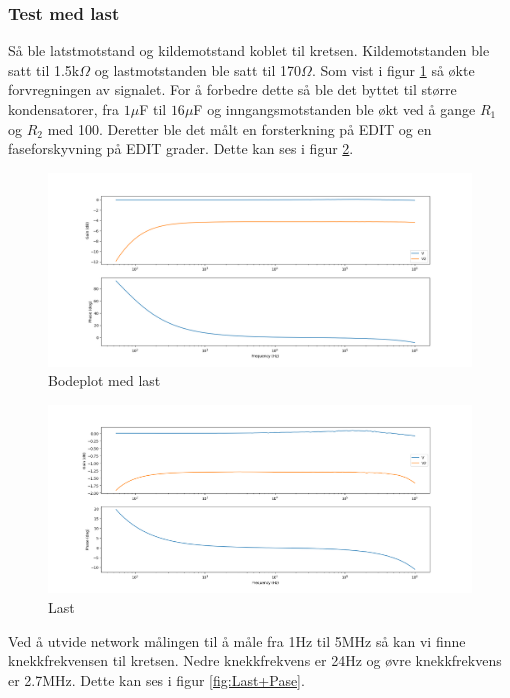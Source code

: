 \subsubsection{Test med last}

Så ble latstmotstand og kildemotstand koblet til kretsen. Kildemotstanden ble satt til 1.5k$\Omega$ og lastmotstanden ble satt til 170$\Omega$. Som vist i figur \ref{fig:Bodeplot+Pase_Second} så økte forvregningen av signalet. For å forbedre dette så ble det byttet til større kondensatorer, fra $1\mu$F til $16\mu$F og inngangsmotstanden ble økt ved å gange $R_1$ og $R_2$ med 100. Deretter ble det målt en forsterkning på EDIT og en faseforskyvning på EDIT grader. Dette kan ses i figur \ref{fig:Third}.

\begin{figure}[H]
\centering
\includegraphics[scale=0.4]{bilder/Bodeplot+Pase_Second.png}
\caption{Bodeplot med last}
\label{fig:Bodeplot+Pase_Second}
\end{figure}

\begin{figure}[H]
\centering
\includegraphics[scale=0.4]{bilder/Bodeplot+Pase_Third.png}
\caption{Last}
\label{fig:Third}
\end{figure}

Ved å utvide network målingen til å måle fra 1Hz til 5MHz så kan vi finne knekkfrekvensen til kretsen. Nedre knekkfrekvens er 24Hz og øvre knekkfrekvens er 2.7MHz. Dette kan ses i figur \ref{fig:Last+Pase}.


